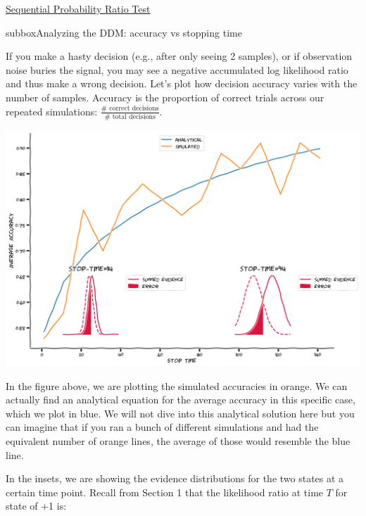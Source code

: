 \begin{textbox}{\href{https://compneuro.neuromatch.io/tutorials/W3D2_HiddenDynamics/student/W3D2_Tutorial1.html}{Sequential Probability Ratio Test }   }

\begin{subbox}{subbox}{Analyzing the DDM: accuracy vs stopping time}
\scriptsize

If you make a hasty decision (e.g., after only seeing 2 samples), or if observation noise buries the signal, you may see a negative accumulated log likelihood ratio and thus make a wrong decision. Let's plot how decision accuracy varies with the number of samples. Accuracy is the proportion of correct trials across our repeated simulations: $\frac{\# \textrm{ correct decisions}}{\# \textrm{ total decisions}}$.

\begin{center}
    
\includegraphics[scale=0.2]{Figures/HD/HD_Figure2.png}
\end{center}
In the figure above, we are plotting the simulated accuracies in orange. We can actually find an analytical equation for the average accuracy in this specific case, which we plot in blue. We will not dive into this analytical solution here but you can imagine that if you ran a bunch of different simulations and had the equivalent number of orange lines, the average of those would resemble the blue line. 

In the insets, we are showing the evidence distributions for the two states at a certain time point. Recall from Section 1 that the likelihood ratio at time $T$ for state of +1 is: 


\end{subbox}
\end{textbox}
